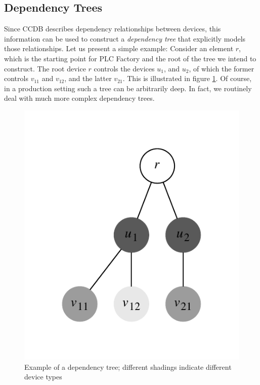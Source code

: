 \documentclass[a4paper,
              ]{jacow}
\begin{document}
\subsection{Dependency Trees}
Since CCDB describes dependency relationships between devices, this information can be used to construct a \emph{dependency tree} that explicitly models those relationships. Let us present a simple example: Consider an element $r$, which is the starting point for PLC Factory and the root of the tree we intend to construct. The root device $r$ controls the devices $u_1$, and $u_2$, of which the former controls $v_{11}$ and $v_{12}$, and the latter $v_{21}$. This is illustrated in figure \ref{fig:deviceTree}. Of course, in a production setting such a tree can be arbitrarily deep. In fact, we routinely deal with much more complex dependency trees.

\begin{figure}[h]
\centering
  \includegraphics[scale=0.9]{figures/deviceTree.pdf}
  \caption{Example of a dependency tree; different shadings indicate different device types}
  \label{fig:deviceTree}
\end{figure}

\end{document}
